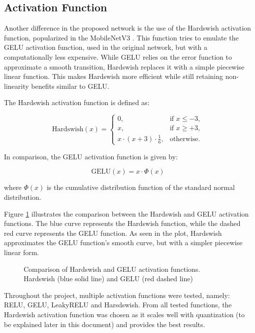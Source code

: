 \documentclass[lettersize,journal]{IEEEtran}
\begin{document}
\subsection{Activation Function}
Another difference in the proposed network is the use of the Hardswish activation function, popularized in the MobileNetV3 \cite{koonce2021mobilenetv3}. This function tries to emulate the GELU activation function, used in the original network, but with a computationally less expensive. While GELU relies on the error function to approximate a smooth transition, Hardswish replaces it with a simple piecewise linear function. This makes Hardswish more efficient while still retaining non-linearity benefits similar to GELU. 

The Hardswish activation function is defined as:

\[
\text{Hardswish}(x) =
\begin{cases} 
0, & \text{if } x \leq -3, \\
x, & \text{if } x \geq +3, \\
x \cdot (x + 3) \cdot \frac{1}{6}, & \text{otherwise}.
\end{cases}
\]

In comparison, the GELU activation function is given by:

\[
\text{GELU}(x) = x \cdot \Phi(x)
\]

where \(\Phi(x)\) is the cumulative distribution function of the standard normal distribution.

Figure \ref{fig:activation_comparison} illustrates the comparison between the Hardswish and GELU activation functions. The blue curve represents the Hardswish function, while the dashed red curve represents the GELU function. As seen in the plot, Hardswish approximates the GELU function's smooth curve, but with a simpler piecewise linear form.

\begin{figure}[htbp]
    \centerline{}
\caption{Comparison of Hardswish and GELU activation functions. Hardswish (blue solid line) and GELU (red dashed line)}
\label{fig:activation_comparison}
\end{figure}

Throughout the project, multiple activation functions were tested, namely: RELU, GELU, LeakyRELU and Harsdswish.
From all tested functions, the Hardswish activation function was chosen as it scales well with quantization (to be explained later in this document) and provides the best results.  
\end{document}

